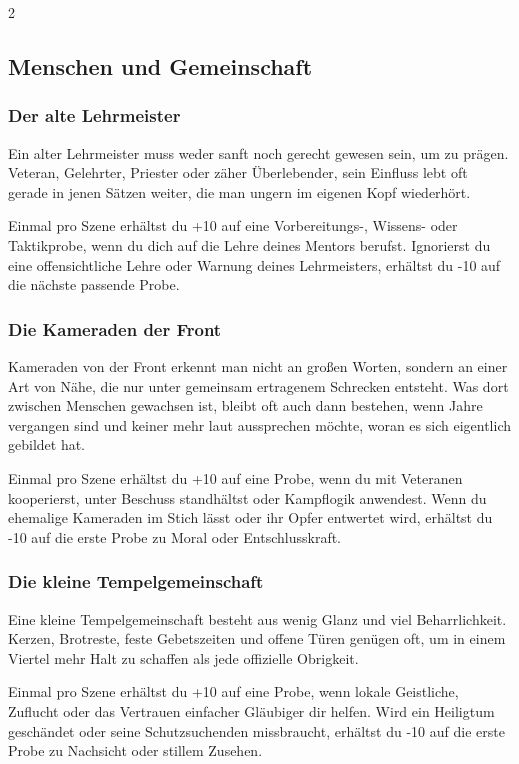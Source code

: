 {\begin{multicols*}{2}
        \subsection{Menschen und Gemeinschaft}\label{subsec:bindungen-gemeinschaft}

        \subsubsection*{Der alte Lehrmeister}
        Ein alter Lehrmeister muss weder sanft noch gerecht gewesen sein, um zu prägen. Veteran, Gelehrter, Priester oder zäher Überlebender, sein Einfluss lebt oft gerade in jenen Sätzen weiter, die man ungern im eigenen Kopf wiederhört.

        \bindungspielwertebox
        {Einmal pro Szene erhältst du +10 auf eine Vorbereitungs-, Wissens- oder Taktikprobe, wenn du dich auf die Lehre deines Mentors berufst.}
        {Ignorierst du eine offensichtliche Lehre oder Warnung deines Lehrmeisters, erhältst du -10 auf die nächste passende Probe.}

        \subsubsection*{Die Kameraden der Front}
        Kameraden von der Front erkennt man nicht an großen Worten, sondern an einer Art von Nähe, die nur unter gemeinsam ertragenem Schrecken entsteht. Was dort zwischen Menschen gewachsen ist, bleibt oft auch dann bestehen, wenn Jahre vergangen sind und keiner mehr laut aussprechen möchte, woran es sich eigentlich gebildet hat.

        \bindungspielwertebox
        {Einmal pro Szene erhältst du +10 auf eine Probe, wenn du mit Veteranen kooperierst, unter Beschuss standhältst oder Kampflogik anwendest.}
        {Wenn du ehemalige Kameraden im Stich lässt oder ihr Opfer entwertet wird, erhältst du -10 auf die erste Probe zu Moral oder Entschlusskraft.}

        \subsubsection*{Die kleine Tempelgemeinschaft}
        Eine kleine Tempelgemeinschaft besteht aus wenig Glanz und viel Beharrlichkeit. Kerzen, Brotreste, feste Gebetszeiten und offene Türen genügen oft, um in einem Viertel mehr Halt zu schaffen als jede offizielle Obrigkeit.

        \bindungspielwertebox
        {Einmal pro Szene erhältst du +10 auf eine Probe, wenn lokale Geistliche, Zuflucht oder das Vertrauen einfacher Gläubiger dir helfen.}
        {Wird ein Heiligtum geschändet oder seine Schutzsuchenden missbraucht, erhältst du -10 auf die erste Probe zu Nachsicht oder stillem Zusehen.}


\end{multicols*}}
